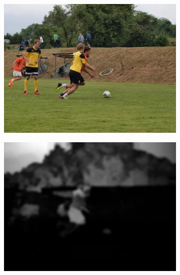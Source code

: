\begin{figure}[H]
    \centering
    \begin{subfigure}{0.32\textwidth}
      \includegraphics[scale=1.0]{obrazky/ORIGfotbal1.jpg}
      \caption{}
    \end{subfigure}
    \begin{subfigure}{.32\textwidth}
      \includegraphics[scale=1.0]{obrazky/MargolinSMfotbal1.jpg}
      \caption{}
    \end{subfigure}
    \begin{subfigure}{.32\textwidth}

\end{subfigure}
\end{figure}
